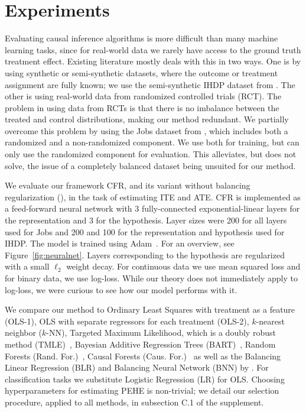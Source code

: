 \section{Experiments}
\label{sec:experiments}

Evaluating causal inference algorithms is more difficult than many machine learning tasks, since for real-world data we rarely have access to the ground truth treatment effect. Existing literature mostly deals with this in two ways. One is by using synthetic or semi-synthetic datasets, where the outcome or treatment assignment are fully known; we use the semi-synthetic IHDP dataset from \citet{hill2011bayesian}. The other is using real-world data from randomized controlled trials (RCT). The problem in using data from RCTs is that there is no imbalance between the treated and control distributions, making our method redundant. We partially overcome this problem by using the Jobs dataset from \citet{lalonde1986evaluating}, which includes both a randomized and a non-randomized component. We use both for training, but can only use the randomized component for evaluation. This alleviates, but does not solve, the issue of a completely balanced dataset being unsuited for our method.

We evaluate our framework CFR, and its variant without balancing regularization (\tarnet{}), in the task of estimating ITE and ATE. CFR is implemented as a feed-forward neural network with 3 fully-connected exponential-linear layers for the representation and 3 for the hypothesis. Layer sizes were 200 for all layers used for Jobs and 200 and 100 for the representation and hypothesis used for IHDP. The model is trained using Adam~\citep{kingma2014adam}. For an overview, see Figure~\ref{fig:neuralnet}. Layers corresponding to the hypothesis are regularized with a small $\ell_2$ weight decay.  For continuous data we use mean squared loss and for binary data, we use log-loss. While our theory does not immediately apply to log-loss, we were curious to see how our model performs with it. %

We compare our method to Ordinary Least Squares with treatment as a feature (OLS-1), OLS with separate regressors for each treatment (OLS-2), $k$-nearest neighbor ($k$-NN), Targeted Maximum Likelihood, which is a doubly robust method (TMLE)~\citep{gruber2011tmle}, Bayesian Additive Regression Trees (BART)~\citep{chipman2010bart,bayestree}, Random Forests (Rand. For.)~\citep{breiman2001random}, Causal Forests  (Caus. For.)~\citep{wager2015estimation} as well as the Balancing Linear Regression (BLR) and Balancing Neural Network (BNN) by \citet{johansson2016counterfactual}.
For classification tasks we substitute Logistic Regression (LR) for OLS.  %
Choosing hyperparameters for estimating PEHE is non-trivial; we detail our selection procedure, applied to all methods, in subsection C.1 of the supplement.

